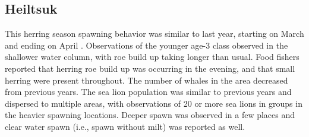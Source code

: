 \subsection{Heiltsuk}

This herring season spawning behavior was similar to last year,
starting on March  and ending on April .
Observations of the younger age-3 class observed in the shallower water column,
with roe build up taking longer than usual.
Food fishers reported that herring roe build up was occurring in the evening,
and that small herring were present throughout.  
The number of whales in the area decreased from previous years.
The sea lion population was similar to previous years and
dispersed to multiple areas,
with observations of 20 or more sea lions in groups
in the heavier spawning locations. 
Deeper spawn was observed in a few places and
clear water spawn (i.e., spawn without milt) was reported as well.  

